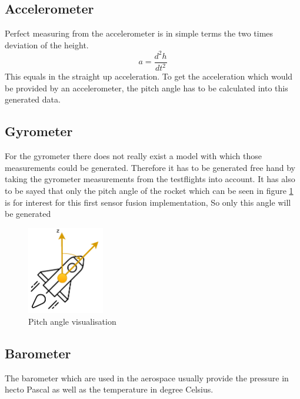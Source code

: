   \subsection{Accelerometer}
  Perfect measuring from the accelerometer is in simple terms the two times deviation of the height.
  $$a = \frac{d^2h}{dt^2}$$
  This equals in the straight up acceleration. To get the acceleration which would be provided by an accelerometer,
  the pitch angle has to be calculated into this generated data.
  
  \subsection{Gyrometer}
  For the gyrometer there does not really exist a model with which those measurements could be generated.
  Therefore it has to be generated free hand by taking the gyrometer measurements from the testflights into account.
  It has also to be sayed that only the pitch angle of the rocket which can be seen in figure \ref{fig:RocketPitchAngle} is for interest for this first sensor fusion implementation,
  So only this angle will be generated
  
  \begin{figure}[h!]
    \centering
    \includegraphics[width = 0.3\textwidth]{./Pictures/RocketSyMod.pdf}
    \caption{Pitch angle visualisation}
    \label{fig:RocketPitchAngle}
  \end{figure}

  
  \subsection{Barometer}
  The barometer which are used in the aerospace usually provide the pressure in hecto Pascal as well as the temperature in degree Celsius.
